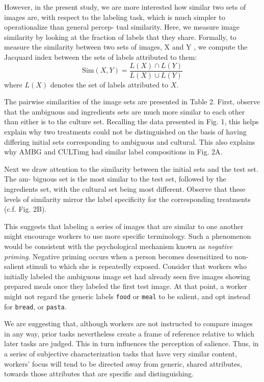 \documentclass[12pt]{article}
\begin{document}
However, in the present study, we are more interested how similar two sets of 
images are, with respect to the labeling task, which is much simpler to 
operationalize than general percep- tual similarity. Here, we measure image 
similarity by looking at the fraction of labels that they share. Formally, to 
measure the similarity between two sets of images, X and Y , we compute the 
Jacquard index between the sets of labels attributed to them:
$$
	\mathrm{Sim}(X,Y) = \frac{L(X) \cap L(Y)}{L(X) \cup L(Y)}
$$
where $L(X)$ denotes the set of labels attributed to $X$.

The pairwise similarities of the image sets are presented in Table 2. First, 
observe that the ambiguous and ingredients sets are much more similar to each 
other than either is to the culture set. Recalling the data presented in 
Fig. 1, this helps explain why two treatments could not be distinguished on 
the basis of having differing initial sets corresponding to ambiguous and 
cultural. This also explains why AMBG and CULTimg had similar label 
compositions in Fig. 2A.

Next we draw attention to the similarity between the initial sets and the test 
set. The am- biguous set is the most similar to the test set, followed by the 
ingredients set, with the cultural set being most different. Observe that these
levels of similarity mirror the label specificity for the corresponding 
treatments (c.f. Fig. 2B).

This suggests that labeling a series of images that are similar to one another 
might encourage workers to use more specific terminology. Such a phenomenon 
would be consistent with the psychological mechanism known as 
\textit{negative priming}.
Negative priming occurs when a person becomes desensitized to non-salient 
stimuli to which she is repeatedly exposed. Consider that workers who 
initially labeled the ambiguous image set had already seen five images 
showing prepared meals once they labeled the first test image. At that point, 
a worker might not regard the generic labels \texttt{food} or \texttt{meal} to 
be salient, and opt instead for \texttt{bread}, or \texttt{pasta}.
 
We are suggesting that, although workers are not instructed to compare images 
in any way, prior tasks nevertheless create a frame of reference relative to 
which later tasks are judged. This in turn influences the perception of 
salience. Thus, in a series of subjective characterization tasks that have 
very similar content, workers' focus will tend to be directed away from 
generic, shared attributes, towards those attributes that are specific and 
distinguishing.
\end{document}
